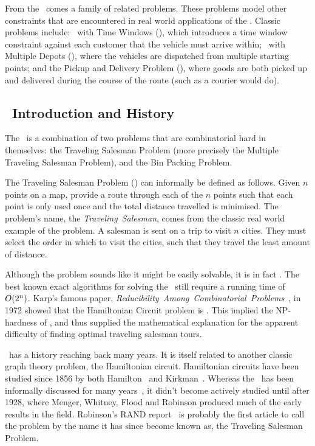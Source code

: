 From the \VRP\ comes a family of related problems. These problems model other constraints that are encountered in real world applications of the \VRP. Classic problems include: \VRP\ with Time Windows (\VRPTW), which introduces a time window constraint against each customer that the vehicle must arrive within; \VRP\ with Multiple Depots (\MDVRP), where the vehicles are dispatched from multiple starting points; and the Pickup and Delivery Problem (\PDP), where goods are both picked up and delivered during the course of the route (such as a courier would do).

\subsection{\TSP\ Introduction and History}
\label{sec:tiah}

The \VRP\ is a combination of two problems that are combinatorial hard in themselves: the Traveling Salesman Problem (more precisely the Multiple Traveling Salesman Problem), and the Bin Packing Problem.

The Traveling Salesman Problem (\TSP) can informally be defined as follows. Given $n$ points on a map, provide a route through each of the $n$ points such that each point is only used once and the total distance travelled is minimised. The problem's name, the \emph{Traveling~Salesman}, comes from the classic real world example of the problem. A salesman is sent on a trip to visit $n$ cities. They must select the order in which to visit the cities, such that they travel the least amount of distance.

Although the problem sounds like it might be easily solvable, it is in fact \nphard. The best known exact algorithms for solving the \TSP\ still require a running time of $\mbox{$O(2^n)$}$. Karp's famous paper, \emph{Reducibility~Among~Combinatorial~Problems}~\cite{Kar72}, in 1972 showed that the Hamiltonian Circuit problem is \npcomplete. This implied the NP-hardness of \TSP, and thus supplied the mathematical explanation for the apparent difficulty of finding optimal traveling salesman tours. 

\TSP\ has a history reaching back many years. It is itself related to another classic graph theory problem, the Hamiltonian circuit. Hamiltonian circuits have been studied since 1856 by both Hamilton~\cite{Hamilton:1856} and Kirkman~\cite{Kirkman:1856}. Whereas the \TSP\ has been informally discussed for many years~\cite{Schrijver}, it didn't become actively studied until after 1928, where Menger, Whitney, Flood and Robinson produced much of the early results in the field. Robinson's RAND report~\cite{Robinson:1949} is probably the first article to call the problem by the name it has since become known as, the Traveling Salesman Problem. 

